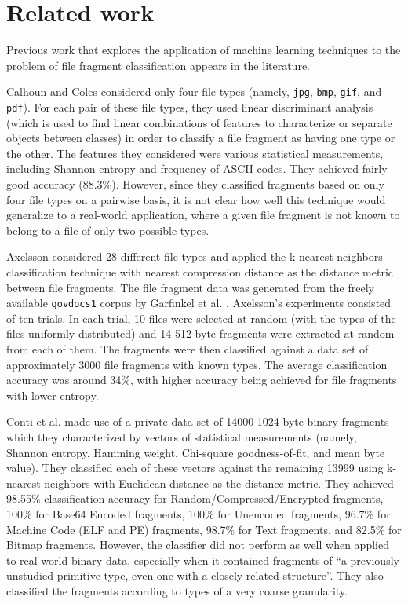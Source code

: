 \documentclass[5p]{elsarticle}
\begin{document}
\section{Related work}
\label{Section:RelatedWork}
Previous work that explores the application of machine learning techniques to the problem of file fragment classification appears in the literature.

Calhoun and Coles \cite{Calhoun08} considered only four file types (namely, \texttt{jpg}, \texttt{bmp}, \texttt{gif}, and \texttt{pdf}). For each pair of these file types, they used linear discriminant analysis \cite{Fisher36} (which is used to find linear combinations of features to characterize or separate objects between classes) in order to classify a file fragment as having one type or the other. The features they considered were various statistical measurements, including Shannon entropy \cite{Shannon48} and frequency of ASCII codes. They achieved fairly good accuracy (88.3\%). However, since they classified fragments based on only four file types on a pairwise basis, it is not clear how well this technique would generalize to a real-world application, where a given file fragment is not known to belong to a file of only two possible types.

Axelsson \cite{Axelsson10} considered 28 different file types and applied the k-nearest-neighbors classification technique with nearest compression distance as the distance metric between file fragments. The file fragment data was generated from the freely available \texttt{govdocs1} corpus by Garfinkel et al. \cite{Garfinkel09}. Axelsson's experiments consisted of ten trials. In each trial, 10 files were selected at random (with the types of the files uniformly distributed) and 14 512-byte fragments were extracted at random from each of them. The fragments were then classified against a data set of approximately 3000 file fragments with known types. The average classification accuracy was around 34\%, with higher accuracy being achieved for file fragments with lower entropy.

Conti et al. \cite{Conti10} made use of a private data set of 14000 1024-byte binary fragments which they characterized by vectors of statistical measurements (namely, Shannon entropy, Hamming weight, Chi-square goodness-of-fit, and mean byte value). They classified each of these vectors against the remaining 13999 using k-nearest-neighbors with Euclidean distance as the distance metric. They achieved 98.55\% classification accuracy for Random/Compressed/Encrypted fragments, 100\% for Base64 Encoded fragments, 100\% for Unencoded fragments, 96.7\% for Machine Code (ELF and PE) fragments, 98.7\% for Text fragments, and 82.5\% for Bitmap fragments. However, the classifier did not perform as well when applied to real-world binary data, especially when it contained fragments of ``a previously unstudied primitive type, even one with a closely related structure''. They also classified the fragments according to types of a very coarse granularity.
\end{document}
